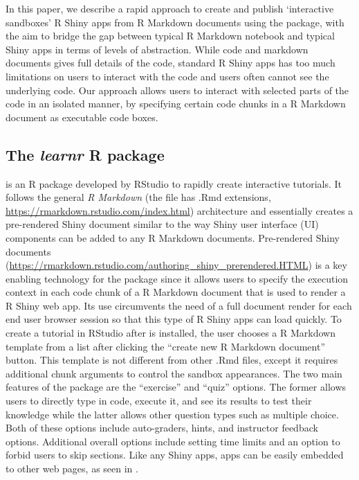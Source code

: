 In this paper, we describe a rapid approach to create and publish
`interactive sandboxes' R Shiny apps from R Markdown documents using the
 package, with the aim to bridge the gap between typical R
Markdown notebook and typical Shiny apps in terms of levels of
abstraction. While code and markdown documents gives full details of the
code, standard R Shiny apps has too much limitations on users to
interact with the code and users often cannot see the underlying code.
Our approach allows users to interact with selected parts of the code in
an isolated manner, by specifying certain code chunks in a R Markdown
document as executable code boxes.

\hypertarget{the-learnr-r-package}{%
\subsection{\texorpdfstring{The \emph{learnr} R
package}{The learnr R package}}\label{the-learnr-r-package}}

 \citep{learnr} is an R package developed by RStudio to
rapidly create interactive tutorials. It follows the general \textit{R
  Markdown} (the file has .Rmd extensions,
\url{https://rmarkdown.rstudio.com/index.html}) architecture and
essentially creates a pre-rendered Shiny document similar to the way
Shiny user interface (UI) components can be added to any R Markdown
documents. Pre-rendered Shiny documents
(\url{https://rmarkdown.rstudio.com/authoring_shiny_prerendered.HTML})
is a key enabling technology for the  package since it
allows users to specify the execution context in each code chunk of a R
Markdown document that is used to render a R Shiny web app. Its use
circumvents the need of a full document render for each end user browser
session so that this type of R Shiny apps can load quickly. To create a
 tutorial in RStudio after  is installed, the
user chooses a  R Markdown template from a list after
clicking the ``create new R Markdown document'' button. This template is
not different from other .Rmd files, except it requires additional chunk
arguments to control the sandbox appearances. The two main features of
the  package are the ``exercise'' and ``quiz'' options. The
former allows users to directly type in code, execute it, and see its
results to test their knowledge while the latter allows other question
types such as multiple choice. Both of these options include
auto-graders, hints, and instructor feedback options. Additional overall
options include setting time limits and an option to forbid users to
skip sections. Like any Shiny apps,  apps can be easily
embedded to other web pages, as seen in \citet{rmrwr}.

